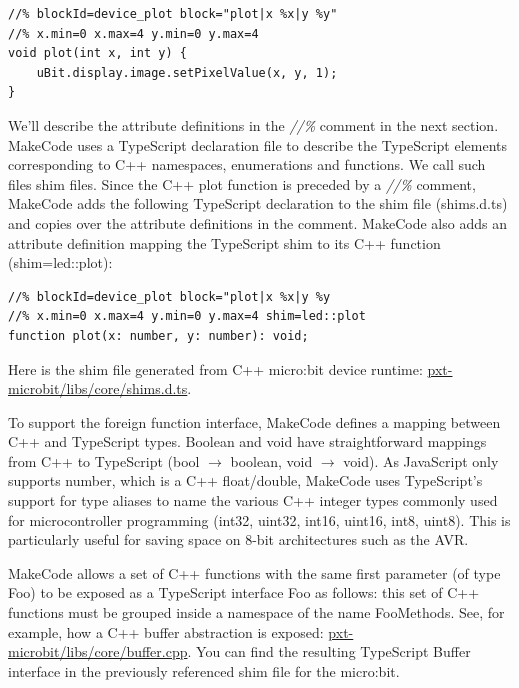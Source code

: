 \begin{lstlisting}
//% blockId=device_plot block="plot|x %x|y %y"
//% x.min=0 x.max=4 y.min=0 y.max=4
void plot(int x, int y) {
    uBit.display.image.setPixelValue(x, y, 1);
}
\end{lstlisting}

We'll describe the attribute definitions in the \emph{//\%} comment in the next section. 
MakeCode uses a TypeScript declaration file to describe the TypeScript elements corresponding
to C++ namespaces, enumerations and functions.  We call such files shim files.
Since the C++ plot function is preceded by a \emph{//\%} comment, 
MakeCode adds the following TypeScript declaration to the shim file (shims.d.ts) and copies
over the attribute definitions in the comment. MakeCode also adds an attribute definition mapping
the TypeScript shim to its C++ function (shim=led::plot):

\begin{lstlisting}
//% blockId=device_plot block="plot|x %x|y %y
//% x.min=0 x.max=4 y.min=0 y.max=4 shim=led::plot
function plot(x: number, y: number): void;
\end{lstlisting}

Here is the shim file generated from C++ micro:bit device runtime:
\href{https://github.com/Microsoft/pxt-microbit/blob/master/libs/core/shims.d.ts}{pxt-microbit/libs/core/shims.d.ts}.

To support the foreign function interface, MakeCode defines a mapping between C++ and TypeScript types.
Boolean and void have straightforward mappings from C++ to TypeScript (bool $\rightarrow$ boolean, void $\rightarrow$ void). 
As JavaScript only supports number, which is a C++ float/double, MakeCode uses TypeScript's support
for type aliases to name the various C++ integer types commonly used for microcontroller programming
(int32, uint32, int16, uint16, int8, uint8). 
This is particularly useful for saving space on 8-bit architectures such as the AVR. 

MakeCode allows a set of C++ functions with the same first parameter (of type Foo) to be
exposed as a TypeScript interface Foo as follows: this set of C++ functions must be grouped
inside a namespace of the name FooMethods.  See, for example, how a C++ buffer abstraction is exposed:
\href{https://github.com/Microsoft/pxt-microbit/blob/master/libs/core/buffer.cpp}{pxt-microbit/libs/core/buffer.cpp}.
You can find the resulting TypeScript Buffer interface in the previously referenced shim file for the micro:bit.

